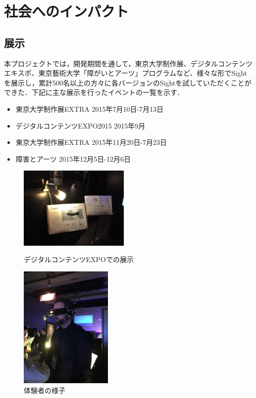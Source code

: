 \section{社会へのインパクト}


\subsection{展示}

本プロジェクトでは，開発期間を通して，東京大学制作展、デジタルコンテンツエキスポ、東京藝術大学「障がいとアーツ」プログラムなど、様々な形でSightを展示し，累計500名以上の方々に各バージョンのSightを試していただくことができた．下記に主な展示を行ったイベントの一覧を示す．

\begin{itemize}
 \item 東京大学制作展EXTRA 2015年7月10日-7月13日
 \item デジタルコンテンツEXPO2015 2015年9月
 \item 東京大学制作展EXTRA 2015年11月20日-7月23日
 \item 障害とアーツ 2015年12月5日-12月6日
\end{itemize}


\begin{figure}[h]

\begin{minipage}{0.49\columnwidth}
\begin{center}
\includegraphics[height=40mm, bb=0 0 1024 768]{images/publicity/DCEXPO1.jpg}
\caption{デジタルコンテンツEXPOでの展示}
\end{center}
\end{minipage}
\begin{minipage}{0.49\columnwidth}
\begin{center}
\includegraphics[height=60mm, bb=0 0 768 1024]{images/publicity/DCEXPO2.jpg}
\caption{体験者の様子}
\end{center}
\end{minipage}

\end{figure}


